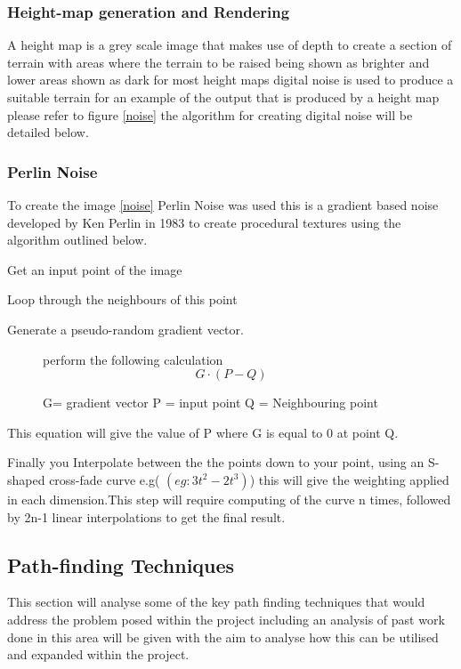 \subsubsection{Height-map generation and Rendering}
A height map is a grey scale image that makes use of depth to create a section of terrain with areas where the terrain to be raised being shown as brighter and lower areas shown as dark for most height maps digital noise is used to produce a suitable terrain for an example of the output that is produced by a height map please refer to figure \ref{noise} the algorithm for creating digital noise will be detailed below. 

\subsubsection{Perlin Noise}
\label{Perlin}
To create the image \ref{noise} Perlin Noise was used this is a gradient based noise developed by Ken Perlin in 1983 \cite{perlin} to create procedural textures using the algorithm outlined below. 
\begin{itemize}
\item Get an input point of the image 
\item Loop through the neighbours of this point
\item Generate a pseudo-random gradient vector.
\begin{figure}[h]
\centering
\item perform the following calculation
\begin{equation}
\label{eq:Noise}
G \cdot(P-Q)
\end{equation}
\caption{G= gradient vector P = input point Q = Neighbouring point}
\label{noise:eq}
\end{figure}

This equation will give the value of P where G is equal to 0 at point Q.
\item Finally you Interpolate between the the points down to your point, using an S-shaped cross-fade curve e.g( 
\begin{math}(eg: 3t^2-2t^3)\end{math}) this will give the weighting applied in each dimension.This step will require computing of the curve n times, followed by 2n-1 linear interpolations to get the final result.
\end{itemize}

\subsection{Path-finding Techniques}
This section will analyse some of the key path finding techniques that would address the problem posed within the project including an analysis of past work done in this area will be given with the aim to analyse how this can be utilised and expanded within the project. 
